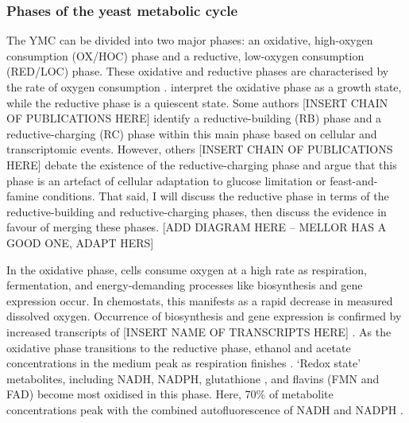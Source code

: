 \subsubsection{Phases of the yeast metabolic cycle}
\label{subsubsec:intro-ymc-definition-phases}
The YMC can be divided into two major phases: an oxidative, high-oxygen consumption (OX/HOC) phase and a reductive, low-oxygen consumption (RED/LOC) phase.
These oxidative and reductive phases are characterised by the rate of oxygen consumption \citep{mellorMolecularBasisMetabolic2016}.
\citet{krishnaMinimalPushPull2018} interpret the oxidative phase as a growth state, while the reductive phase is a quiescent state.
Some authors [INSERT CHAIN OF PUBLICATIONS HERE] identify a reductive-building (RB) phase and a reductive-charging (RC) phase within this main phase based on cellular and transcriptomic events.
However, others [INSERT CHAIN OF PUBLICATIONS HERE] debate the existence of the reductive-charging phase and argue that this phase is an artefact of cellular adaptation to glucose limitation or feast-and-famine conditions.
That said, I will discuss the reductive phase in terms of the reductive-building and reductive-charging phases, then discuss the evidence in favour of merging these phases.
[ADD DIAGRAM HERE -- MELLOR HAS A GOOD ONE, ADAPT HERS]

In the oxidative phase, cells consume oxygen at a high rate as respiration, fermentation, and
energy-demanding processes
like biosynthesis and gene expression occur.
In chemostats, this manifests as a rapid decrease in measured dissolved oxygen.
Occurrence of biosynthesis and gene expression is confirmed by increased transcripts of [INSERT NAME OF TRANSCRIPTS HERE] \parencite{tuLogicYeastMetabolic2005}.
As the oxidative phase transitions to the reductive phase, ethanol and acetate concentrations in the medium peak as respiration finishes \citep{tuLogicYeastMetabolic2005}.
`Redox state' metabolites, including NADH, NADPH, glutathione \citep{lloydUltradianMetronomeTimekeeper2005}, and flavins (FMN and FAD) %
\parencite{murrayRedoxRegulationRespiring2011} become most oxidised in this phase.
Here, 70\% of metabolite concentrations peak with the combined autofluorescence of NADH and NADPH \citep{murrayRegulationYeastOscillatory2007}.

